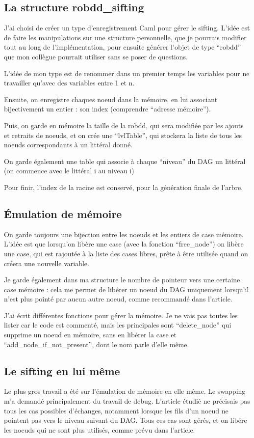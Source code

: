 \documentclass[a4paper,10pt]{article}
\begin{document}
\subsection{La structure robdd\_sifting}
J'ai choisi de créer un type d'enregistrement Caml pour gérer le sifting. L'idée est de faire les manipulations sur une structure personnelle, que je pourrais modifier tout au long de 
l'implémentation, pour ensuite générer l'objet de type ``robdd'' que mon collègue pourrait utiliser sans se poser de questions.

L'idée de mon type est de renommer dans un premier temps les variables pour ne travailler qu'avec des variables entre 1 et n.

Ensuite, on enregistre chaques noeud dans la mémoire, en lui associant bijectivement un entier : son index (comprendre ``adresse mémoire''). 

Puis, on garde en mémoire la taille de la robdd, qui sera modifiée par les ajouts et retraits de noeuds, et on crée une ``lvlTable'', qui stockera la liste de tous les noeuds correspondants à un 
littéral donné.

On garde également une table qui associe à chaque ``niveau'' du DAG un littéral (on commence avec le littéral i au niveau i)

Pour finir, l'index de la racine est conservé, pour la génération finale de l'arbre.

\subsection{Émulation de mémoire}
On garde toujours une bijection entre les noeuds et les entiers de case mémoire. L'idée est que lorsqu'on libère une case (avec la fonction ``free\_node'') on libère une case, qui est rajoutée à la liste des 
cases libres, prête à être utilisée quand on créera une nouvelle variable.

Je garde également dans ma structure le nombre de pointeur vers une certaine case mémoire : cela me permet de libérer un noeud du DAG uniquement lorsqu'il n'est plus pointé par aucun autre
noeud, comme recommandé dans l'article.

J'ai écrit différentes fonctions pour gérer la mémoire. Je ne vais pas toutes les lister car le code est commenté, mais les principales sont ``delete\_node'' qui supprime un noeud en mémoire, sans en libérer la
case et ``add\_node\_if\_not\_present'', dont le nom parle d'elle même.

\subsection{Le sifting en lui même}
Le plus gros travail a été sur l'émulation de mémoire en elle même. Le swapping m'a demandé principalement du travail de debug. L'article étudié ne précisais pas tous les cas possibles d'échanges, 
notamment lorsque les fils d'un noeud ne pointent pas vers le niveau suivant du DAG. Tous ces cas sont gérés, et on libére les noeuds qui ne sont plus utilisés, comme prévu dans l'article.
\end{document}
